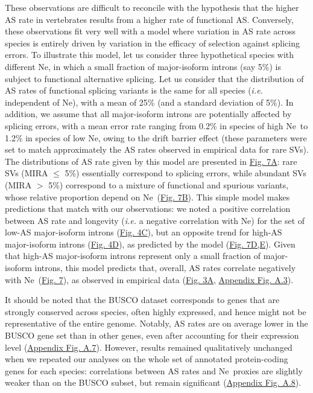 These observations are difficult to reconcile with the hypothesis that the higher AS rate in vertebrates results from a higher rate of functional AS. Conversely, these observations fit very well with a model where variation in AS rate across species is entirely driven by variation in the efficacy of selection against splicing errors. To illustrate this model, let us consider three hypothetical species with different \acrshort{Ne}, in which a small fraction of major-isoform introns (say 5\%) is subject to functional alternative splicing. Let us consider that the distribution of AS rates of functional splicing variants is the same for all species (\textit{i.e.} independent of \acrshort{Ne}), with a mean of 25\% (and a standard deviation of 5\%). In addition, we assume that all major-isoform introns are potentially affected by splicing errors, with a mean error rate ranging from 0.2\% in species of high \acrshort{Ne}~to 1.2\% in species of low \acrshort{Ne}, owing to the drift barrier effect (these parameters were set to match approximately the AS rates observed in empirical data for rare \acrshort{SV}s). The distributions of AS rate given by this model are presented in \hyperref[fig:AS7]{Fig. 7A}: rare \acrshort{SV}s (MIRA $\leq$ 5\%) essentially correspond to splicing errors, while abundant \acrshort{SV}s (MIRA $>$ 5\%) correspond to a mixture of functional and spurious variants, whose relative proportion depend on \acrshort{Ne}~(\hyperref[fig:AS7]{Fig. 7B}). This simple model makes predictions that match with our observations: we noted a positive correlation between AS rate and longevity (\textit{i.e.} a negative correlation with \acrshort{Ne}) for the set of low-AS major-isoform introns (\hyperref[fig:AS4]{Fig. 4C}), but an opposite trend for high-AS major-isoform introns (\hyperref[fig:AS4]{Fig. 4D}), as predicted by the model (\hyperref[fig:AS7]{Fig. 7D,E}). Given that high-AS major-isoform introns represent only a small fraction of major-isoform introns, this model predicts that, overall, AS rates correlate negatively with \acrshort{Ne}~(\hyperref[fig:AS7]{Fig. 7}), as observed in empirical data (\hyperref[fig:AS3]{Fig. 3A}, \hyperref[supp_fig:AS3]{Appendix Fig. A.3}).


It should be noted that the \acrshort{BUSCO} dataset corresponds to genes that are strongly conserved across species, often highly expressed, and hence might not be representative of the entire genome. Notably, AS rates are on average lower in the \acrshort{BUSCO} gene set than in other genes, even after accounting for their expression level (\hyperref[supp_fig:AS7]{Appendix Fig. A.7}). However, results remained qualitatively unchanged when we repeated our analyses on the whole set of annotated protein-coding genes for each species: correlations between AS rates and \acrshort{Ne}~proxies are slightly weaker than on the \acrshort{BUSCO} subset, but remain significant (\hyperref[supp_fig:AS8]{Appendix Fig. A.8}).

